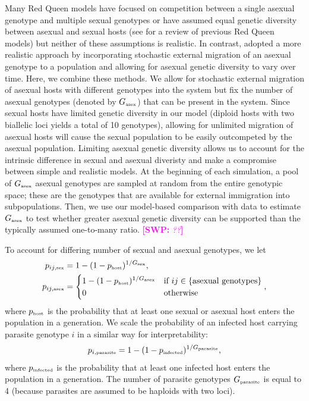 \documentclass{article}\usepackage[]{graphicx}\usepackage[]{color}
\newcommand{\comment}[3]{\textcolor{#1}{\textbf{[#2: }\textit{#3}\textbf{]}}}
\newcommand{\swp}[1]{\comment{magenta}{SWP}{#1}}
\begin{document}
Many Red Queen models have focused on competition between a single asexual genotype and multiple sexual genotypes or have assumed equal genetic diversity between asexual and sexual hosts (see \cite{ashby2015diversity} for a review of previous Red Queen models) but neither of these assumptions is realistic.
In contrast, \cite{ashby2015diversity} adopted a more realistic approach by incorporating stochastic external migration of an asexual genotype to a population and allowing for asexual genetic diversity to vary over time.
Here, we combine these methods.
We allow for stochastic external migration of asexual hosts with different genotypes into the system but fix the number of asexual genotypes (denoted by $G_{\textrm{\tiny asex}}$) that can be present in the system. 
Since sexual hosts have limited genetic diversity in our model (diploid hosts with two biallelic loci yields a total of 10 genotypes), allowing for unlimited migration of asexual hosts will cause the sexual population to be easily outcompeted by the asexual population.
Limiting asexual genetic diversity allows us to account for the intrinsic difference in sexual and asexual diveristy and make a compromise between simple and realistic models.
At the beginning of each simulation, a pool of $G_{\textrm{\tiny asex}}$ asexual genotypes are sampled at random from the entire genotypic space; these are the genotypes that are available for external immigration into subpopulations.
Then, we use our model-based comparison with data to estimate $G_{\textrm{\tiny asex}}$ to test whether greater asexual genetic diversity can be supported than the typically assumed one-to-many ratio.
\swp{??}

To account for differing number of sexual and asexual genotypes, we let 
\begin{equation}
\begin{aligned}
p_{ij, \textrm{\tiny sex}} &= 1-(1-p_{\textrm{\tiny host}})^{1/G_\textrm{\tiny sex}},\\
p_{ij, \textrm{\tiny asex}} &=
\begin{cases}
1-(1-p_{\textrm{\tiny host}})^{1/G_\textrm{\tiny asex}} & \text{if } ij \in \{\text{asexual genotypes}\} \\
0 & \text{otherwise}
\end{cases},
\end{aligned}
\end{equation}
where $p_{\textrm{\tiny host}}$ is the probability that at least one sexual or asexual host enters the population in a generation. We scale the probability of an infected host carrying parasite genotype $i$ in a similar way for interpretability:
\begin{equation}
p_{i, \textrm{\tiny parasite}} = 1 - (1-p_{\textrm{\tiny infected}})^{1/G_\textrm{\tiny parasite}},
\end{equation}
where $p_{\textrm{\tiny infected}}$ is the probability that at least one infected host enters the population in a generation.
The number of parasite genotypes $G_\textrm{\tiny parasite}$ is equal to 4 (because parasites are assumed to be haploids with two loci).
\end{document}
